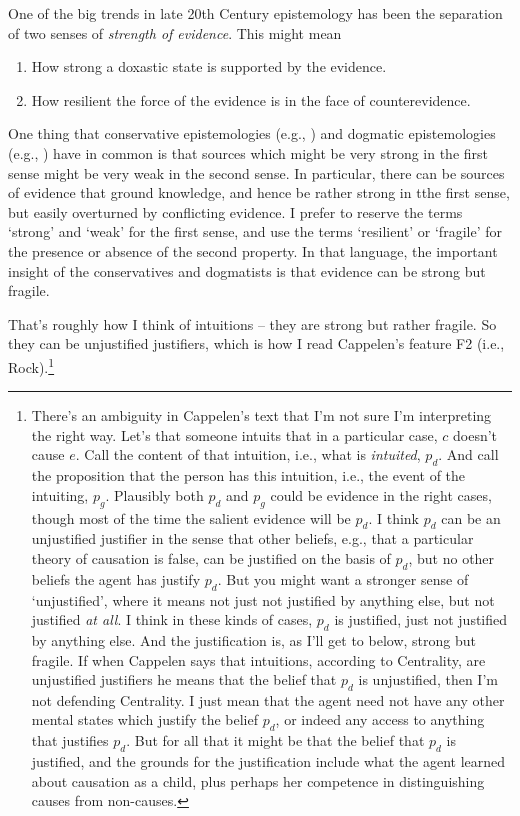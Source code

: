 One of the big trends in late 20th Century epistemology has been the separation of two senses of \textit{strength of evidence}. This might mean

\begin{enumerate}
\item How strong a doxastic state is supported by the evidence.
\item How resilient the force of the evidence is in the face of counterevidence.
\end{enumerate}

\noindent One thing that conservative epistemologies (e.g., \citet{Harman1986}) and dogmatic epistemologies (e.g., \citet{Pryor2000}) have in common is that sources which might be very strong in the first sense might be very weak in the second sense. In particular, there can be sources of evidence that ground knowledge, and hence be rather strong in tthe first sense, but easily overturned by conflicting evidence. I prefer to reserve the terms `strong' and `weak' for the first sense, and use the terms `resilient' or `fragile' for the presence or absence of the second property. In that language, the important insight of the conservatives and dogmatists is that evidence can be strong but fragile.

That's roughly how I think of intuitions -- they are strong but rather fragile. So they can be unjustified justifiers, which is how I read Cappelen's feature F2 (i.e., Rock).\footnote{There's an ambiguity in Cappelen's text that I'm not sure I'm interpreting the right way. Let's that someone intuits that in a particular case, $c$ doesn't cause $e$. Call the content of that intuition, i.e., what is \textit{intuited}, $p_d$.  And call the proposition that the person has this intuition, i.e., the event of the intuiting, $p_g$. Plausibly both $p_d$ and $p_g$ could be evidence in the right cases, though most of the time the salient evidence will be $p_d$. I think $p_d$ can be an unjustified justifier in the sense that other beliefs, e.g., that a particular theory of causation is false, can be justified on the basis of $p_d$, but no other beliefs the agent has justify $p_d$. But you might want a stronger sense of `unjustified', where it means not just not justified by anything else, but not justified \textit{at all}. I think in these kinds of cases, $p_d$ is justified, just not justified by anything else. And the justification is, as I'll get to below, strong but fragile. If when Cappelen says that intuitions, according to Centrality, are unjustified justifiers he means that the belief that $p_d$ is unjustified, then I'm not defending Centrality. I just mean that the agent need not have any other mental states which justify the belief $p_d$, or indeed any access to anything that justifies $p_d$. But for all that it might be that the belief that $p_d$ is justified, and the grounds for the justification include what the agent learned about causation as a child, plus perhaps her competence in distinguishing causes from non-causes.}

